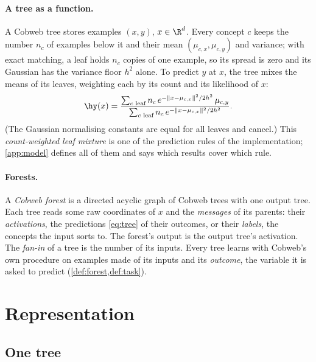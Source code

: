 \paragraph{A tree as a function.}
A Cobweb tree stores examples $(x,y)$, $x\in\R^d$.  Every concept $c$ keeps the number
$n_c$ of examples below it and their mean $(\mu_{c,x},\mu_{c,y})$ and variance; with exact
matching, a leaf holds $n_c$ copies of one example, so its spread is zero and its Gaussian
has the variance floor $h^2$ alone.  To predict $y$ at $x$, the tree mixes the means of its
leaves, weighting each by its count and its likelihood of $x$:
\begin{equation}\label{eq:tree}
  \hy(x)=\frac{\sum_{c\text{ leaf}}n_c\,e^{-\|x-\mu_{c,x}\|^2/2h^2}\,\mu_{c,y}}
              {\sum_{c\text{ leaf}}n_c\,e^{-\|x-\mu_{c,x}\|^2/2h^2}}.
\end{equation}
(The Gaussian normalising constants are equal for all leaves and cancel.)  This
\emph{count-weighted leaf mixture} is one of the prediction rules of the implementation;
\cref{app:model} defines all of them and says which results cover which rule.

\paragraph{Forests.}
A \emph{Cobweb forest} is a directed acyclic graph of Cobweb trees with one output tree.
Each tree reads some raw coordinates of $x$ and the \emph{messages} of its parents: their
\emph{activations}, the predictions \eqref{eq:tree} of their outcomes, or their
\emph{labels}, the concepts the input sorts to.  The forest's output is the output tree's
activation.  The \emph{fan-in} of a tree is the number of its inputs.  Every tree learns
with Cobweb's own procedure on examples made of its inputs and its \emph{outcome}, the
variable it is asked to predict (\cref{def:forest,def:task}).

\section{Representation}\label{sec:repr-main}

\subsection{One tree}

